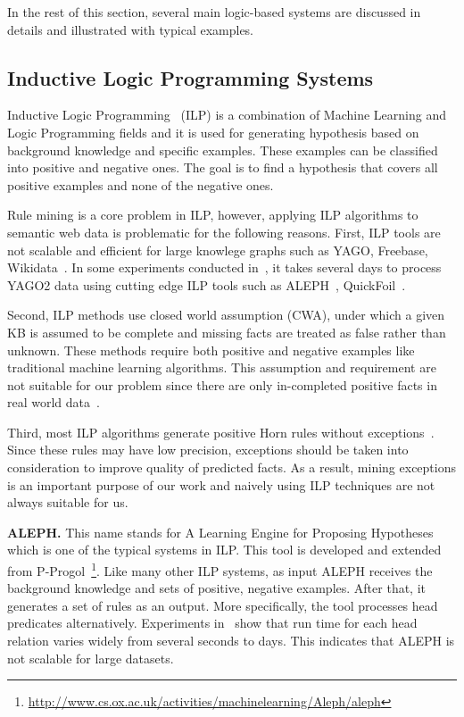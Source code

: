 In the rest of this section, several main logic-based systems are discussed in details and illustrated with typical examples.

\subsection{Inductive Logic Programming Systems}

Inductive Logic Programming~\cite{ref9} (ILP) is a combination of Machine Learning and Logic Programming fields and it is used for generating hypothesis based on background knowledge and specific examples. These examples can be classified into positive and negative ones. The goal is to find a hypothesis that covers all positive examples and none of the negative ones.

Rule mining is a core problem in ILP, however, applying ILP algorithms to semantic web data is problematic for the following reasons. First, ILP tools are not scalable and efficient for large knowlege graphs such as YAGO, Freebase, Wikidata~\cite{ref10}. In some experiments conducted in~\cite{ref10}, it takes several days to process YAGO2 data using cutting edge ILP tools such as ALEPH~\cite{ref14, ref10}, QuickFoil~\cite{ref15, ref10}.

Second, ILP methods use closed world assumption (CWA), under which a given KB is assumed to be complete and missing facts are treated as false rather than unknown. These methods require both positive and negative examples like traditional machine learning algorithms. This assumption and requirement are not suitable for our problem since there are only in-completed positive facts in real world data~\cite{ref10}.

Third, most ILP algorithms generate positive Horn rules without exceptions~\cite{ref11}. Since these rules may have low precision, exceptions should be taken into consideration to improve quality of predicted facts. As a result, mining exceptions is an important purpose of our work and naively using ILP techniques are not always suitable for us.

\textbf{ALEPH.} This name stands for A Learning Engine for Proposing Hypotheses which is one of the typical systems in ILP. This tool is developed and extended from P-Progol~\footnote{\url{http://www.cs.ox.ac.uk/activities/machinelearning/Aleph/aleph}}. Like many other ILP systems, as input ALEPH receives the background knowledge and sets of positive, negative examples. After that, it generates a set of rules as an output. More specifically, the tool processes head predicates alternatively. Experiments in~\cite{ref10} show that run time for each head relation varies widely from several seconds to days. This indicates that ALEPH is not scalable for large datasets.

